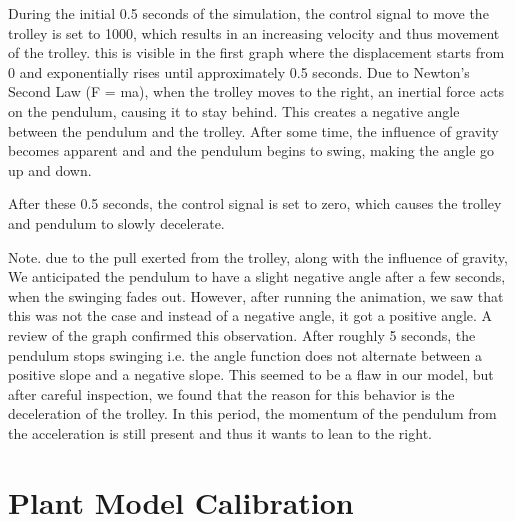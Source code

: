 \documentclass{article}
\begin{document}
During the initial 0.5 seconds of the simulation, the control signal to move the trolley is set to 1000, which results in an increasing velocity and thus movement of the trolley. this is visible in the first graph where the displacement starts from 0 and exponentially rises until approximately 0.5 seconds. Due to Newton's Second Law (F = ma), when the trolley moves to the right, an inertial force acts on the pendulum, causing it to stay behind. This creates a negative angle between the pendulum and the trolley. After some time, the influence of gravity becomes apparent and and the pendulum begins to swing, making the angle go up and down. 

After these 0.5 seconds, the control signal is set to zero, which causes the trolley and pendulum to slowly decelerate. 

Note. due to the pull exerted from the trolley, along with the influence of gravity, We anticipated the pendulum to have a slight negative angle after a few seconds, when the swinging fades out. However, after running the animation, we saw that this was not the case and instead of a negative angle, it got a positive angle. A review of the graph confirmed this observation. After roughly 5 seconds, the pendulum stops swinging i.e. the angle function does not alternate between a positive slope and a negative slope. This seemed to be a flaw in our model, but after careful inspection, we found that the reason for this behavior is the deceleration of the trolley. In this period, the momentum of the pendulum from the acceleration is still present and thus it wants to lean to the right.

\section{Plant Model Calibration}
\end{document}
